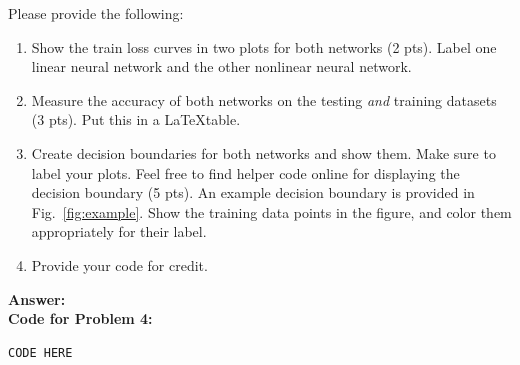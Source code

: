 \documentclass[11pt, oneside]{article}   	%
\begin{document}
Please provide the following:
\begin{enumerate}
    \item Show the train loss curves in two plots for both networks (2 pts). Label one linear neural network and the other nonlinear neural network.
    \item Measure the accuracy of both networks on the testing \emph{and} training datasets (3 pts). Put this in a \LaTeX table.
    \item   Create decision boundaries for both networks and show them. Make sure to label your plots. Feel free to find helper code online for displaying the decision boundary (5 pts). An example decision boundary is provided in Fig.~\ref{fig:example}. Show the training data points in the figure, and color them appropriately for their label.
    \item Provide your code for credit.

\end{enumerate}


\textbf{Answer:} \\



\textbf{Code for Problem 4:} \\
\begin{verbatim}
CODE HERE
\end{verbatim}
\end{document}
